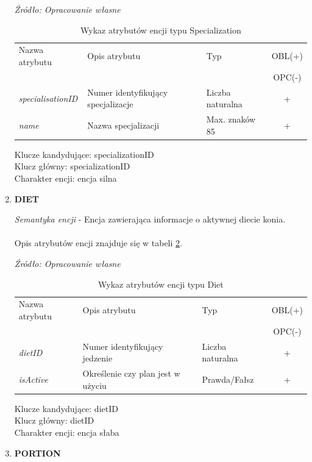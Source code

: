 \documentclass[12pt,twoside]{report}
\begin{document}
\begin{enumerate}[start=1,label={\bfseries ENC\textbackslash0\arabic*}]
	\begin{table}[H]
		\caption{Wykaz atrybutów encji typu Specialization}
		\textit{Źródło: Opracowanie własne}
		\label{SpecialisationAtribute}
		\centering
		\begin{tabular}{|l|l|l|c|}
			\hline
			Nazwa atrybutu & Opis atrybutu & Typ & OBL(+) \\
			& & &  OPC(-) \\
			\hline
			\textit{specialisationID} & Numer identyfikujący specjalizacje & Liczba naturalna & + \\
			\hline
			\textit{name} & Nazwa specjalizacji & Max. znaków 85 & + \\
			\hline
		\end{tabular}
	\end{table}
	Klucze kandydujące: specializationID \\
	Klucz główny: specializationID \\
	Charakter encji: encja silna \\
	
	\item \textbf{DIET}
	
		\textit{Semantyka encji} - Encja zawierająca informacje o aktywnej diecie konia. 
		\\ \\
	Opis atrybutów encji znajduje się w tabeli \ref{DietAtribute}.
	
	\begin{table}[H]
		\caption{Wykaz atrybutów encji typu Diet }
		\textit{Źródło: Opracowanie własne}
		\label{DietAtribute}
		\centering
		\begin{tabular}{|l|l|l|c|}
			\hline
			Nazwa atrybutu & Opis atrybutu & Typ & OBL(+) \\
			& & &  OPC(-) \\
			\hline
			\textit{dietID} & Numer identyfikujący jedzenie & Liczba naturalna & + \\
			\hline
			\textit{isActive} & Określenie czy plan jest w użyciu & Prawda/Fałsz & + \\
			\hline
		\end{tabular}

	\end{table}
	Klucze kandydujące: dietID \\
	Klucz główny: dietID \\
	Charakter encji: encja słaba \\
	
	\item \textbf{PORTION}
	

\end{enumerate}
\end{document}
